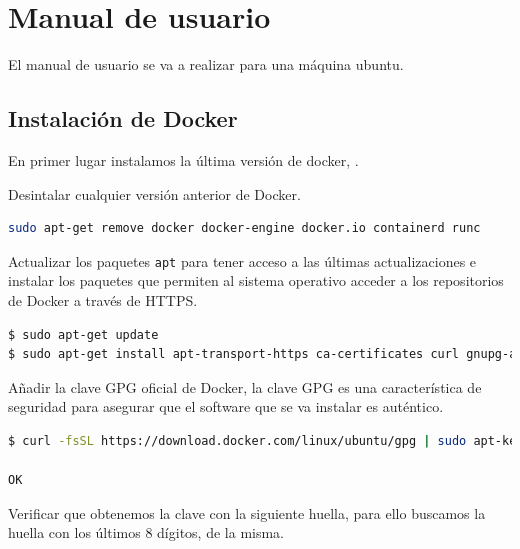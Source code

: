 \chapter{Manual de usuario}

El manual de usuario se va a realizar para una máquina ubuntu.\\

\section{Instalación de Docker}

En primer lugar instalamos la última versión de docker, \cite{instalacion-docker}. 

Desintalar cualquier versión anterior de Docker.\\

\begin{lstlisting}[language=Bash,caption=Instalación Docker. Parte I, label=cod:remove-docker, style=Consola]
sudo apt-get remove docker docker-engine docker.io containerd runc
\end{lstlisting}


Actualizar los paquetes \texttt{apt} para tener acceso a las últimas actualizaciones e instalar los paquetes que permiten al sistema operativo acceder a los repositorios de Docker a través de HTTPS.\\

\begin{lstlisting}[language=Bash,caption=Instalación Docker. Parte II, label=cod:docker-up, style=Consola]
$ sudo apt-get update
$ sudo apt-get install apt-transport-https ca-certificates curl gnupg-agent software-properties-common
\end{lstlisting}

Añadir la clave GPG oficial de Docker, la clave GPG es una característica de seguridad para asegurar que el software que se va instalar es auténtico.\\
 
\begin{lstlisting}[language=Bash,caption=Instalación Docker. Parte III, label=cod:add-huella, style=Consola]
$ curl -fsSL https://download.docker.com/linux/ubuntu/gpg | sudo apt-key add -

OK
\end{lstlisting}

Verificar que obtenemos la clave con la siguiente huella, para ello buscamos la huella con los últimos 8 dígitos, de la misma.\\

